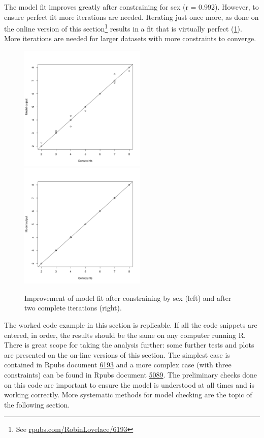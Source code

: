 \documentclass[a4paper, 11pt, twoside]{article}
\begin{document}
The model fit improves greatly after constraining for sex (r = 0.992).
However, to ensure perfect fit more iterations are needed. Iterating
just once more, as done on the online version of this
section\footnote{See
\href{http://rpubs.com/RobinLovelace/6193}{rpubs.com/RobinLovelace/6193}
}
results in a fit that is virtually perfect (\cref{fexits}). More iterations
are needed for larger datasets with more constraints to converge.

\begin{figure} \begin{center}
 \includegraphics[width = 6cm]{unnamed-chunk-8}
 \includegraphics[width = 6cm]{unnamed-chunk-11}
 \end{center}
 \caption[Improvement of model fit with iterations]
 {Improvement of model fit after constraining by sex (left)
 and after two complete iterations (right).} \label{fexits}
\end{figure}

The worked code example in this section is replicable.
If all the code snippets are entered, in order, the results
should be the same on any computer running R. There
is great scope for taking the analysis further:
some further tests and plots are presented on the on-line
versions of this section. The simplest case is contained in
Rpubs document \href{http://rpubs.com/RobinLovelace/6193}{6193} and a more
complex case (with three constraints) can be found in Rpubs document
\href{http://rpubs.com/RobinLovelace/5089}{5089}. The preliminary checks
done on this code are important to ensure the model is understood
at all times and is working correctly. More systematic methods
for model checking are the topic of the following section.
\end{document}
